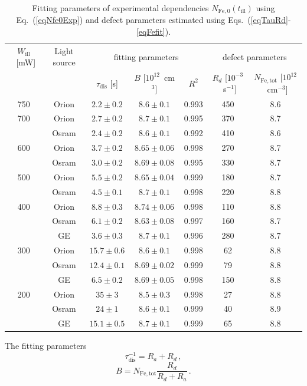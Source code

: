 \documentclass{WileyMSP-template}
\begin{document}
\begin{table}
 \caption{ Fitting parameters of experimental dependencies $N_\mathrm{Fe,0}(t_\mathrm{ill})$
 using Eq.~(\ref{eqNfe0Exp}) and defect parameters estimated using Eqs.~(\ref{eqTauRd}-\ref{eqFefit}).
}
 \label{tb1}
  \begin{tabular}[htbp]{@{}ccccccc@{}}
    \hline
    $W_\mathrm{ill}$~[mW] & Light source & \multicolumn{3}{c}{fitting parameters}&\multicolumn{2}{c}{defect parameters} \\
     &  & $\tau_\mathrm{dis}$ [s] & $B$ [$10^{12}$~cm$^3$] & $R^2$ & $R_d$ [$10^{-3}$~s$^{-1}$] & $N_\mathrm{Fe,tot}$ [$10^{12}$~cm$^{-3}$] \\
    \hline
    750  & Orion  & $2.2\pm0.2$ & $8.6\pm0.1$ & 0.993 &450&8.6\\
    700  & Orion  & $2.7\pm0.2$ & $8.7\pm0.1$ & 0.995 &370&8.7\\
         & Osram  & $2.4\pm0.2$ & $8.6\pm0.1$ & 0.992 &410&8.6\\
    600  & Orion  & $3.7\pm0.2$ & $8.65\pm0.06$ & 0.998&270&8.7 \\
         & Osram  & $3.0\pm0.2$ & $8.69\pm0.08$ & 0.995&330&8.7 \\
    500  & Orion  & $5.5\pm0.2$ & $8.65\pm0.04$ & 0.999&180&8.7 \\
         & Osram  & $4.5\pm0.1$ & $8.7\pm0.1$ & 0.998&220&8.8 \\
    400  & Orion  & $8.8\pm0.3$ & $8.74\pm0.06$ & 0.998&110&8.8 \\
         & Osram  & $6.1\pm0.2$ & $8.63\pm0.08$ & 0.997 &160&8.7\\
         & GE  & $3.6\pm0.3$ & $8.7\pm0.1$ & 0.996 &280&8.7\\
    300  & Orion  & $15.7\pm0.6$ & $8.6\pm0.1$ & 0.998 &62&8.8\\
         & Osram  & $12.4\pm0.1$ & $8.69\pm0.02$ & 0.999&79&8.8 \\
         & GE  & $6.5\pm0.2$ & $8.69\pm0.05$ & 0.998 &150&8.8\\
    200  & Orion  & $35\pm3$ & $8.5\pm0.3$ & 0.998 &27&8.8\\
         & Osram  & $24\pm1$ & $8.6\pm0.1$ & 0.999 &40&8.9\\
         & GE  & $15.1\pm0.5$ & $8.7\pm0.1$ & 0.999 &65&8.8\\
    \hline
  \end{tabular}
\end{table}




The fitting parameters
\begin{equation}
\label{eqTauRd}
\tau_\mathrm{dis}^{-1}=R_a+R_d\,,
\end{equation}
\begin{equation}
\label{eqFefit}
B=N_\mathrm{Fe,tot}\frac{R_d}{R_d+R_a}\,.
\end{equation}
\end{document}
